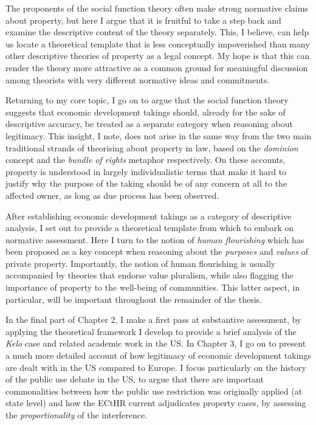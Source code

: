 \documentclass{book} %
\begin{document}
The proponents of the social function theory often make strong normative claims about property, but here I argue that it is fruitful to take a step back and examine the descriptive content of the theory separately. This, I believe, can help us locate a theoretical template that is less conceptually impoverished than many other descriptive theories of property as a legal concept. My hope is that this can render the theory more attractive as a common ground for meaningful discussion among theorists with very different normative ideas and commitments.

Returning to my core topic, I go on to argue that the social function theory suggests that economic development takings should, already for the sake of descriptive accuracy, be treated as a separate category when reasoning about legitimacy. This insight, I note, does not arise in the same way from the two main traditional strands of theorising about property in law, based on the {\it dominion} concept and the {\it bundle of rights} metaphor respectively. On these accounts, property is understood in largely individualistic terms that make it hard to justify why the purpose of the taking should be of any concern at all to the affected owner, as long as due process has been observed.

After establishing economic development takings as a category of descriptive analysis, I set out to provide a theoretical template from which to embark on normative assessment. Here I turn to the notion of {\it human flourishing} which has been proposed as a key concept when reasoning about the {\it purposes} and {\it values} of private property. Importantly, the notion of human flourishing is usually accompanied by theories that endorse value pluralism, while also flagging the importance of property to the well-being of communities. This latter aspect, in particular, will be important throughout the remainder of the thesis. 

In the final part of Chapter 2, I make a first pass at substantive assessment, by applying the theoretical framework I develop to provide a brief analysis of the {\it Kelo} case and related academic work in the US. In Chapter 3, I go on to present a much more detailed account of how legitimacy of economic development takings are dealt with in the US compared to Europe. I focus particularly on the history of the public use debate in the US, to argue that there are important commonalities between how the public use restriction was originally applied (at state level) and how the ECtHR current adjudicates property cases, by assessing the {\it proportionality} of the interference.
\end{document}
